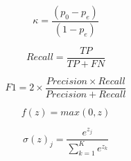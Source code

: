 %   
%   
%   
%   
%   
%   

\begin{equation}
    \kappa = \frac{(p_0-p_e)} {(1-p_e)}
\end{equation}

\begin{equation}
    Recall = \frac{TP} {TP+FN}
\end{equation}

\begin{equation}
    F1 = 2\times\frac{Precision\times Recall} {Precision+Recall}
\end{equation}

\begin{equation}
    f(z)=max(0,z)
\end{equation}

\begin{equation}
    \sigma(z)_j = \frac{e^{z_j}} {\sum_{k=1}^{K} e^{z_k}}
\end{equation}